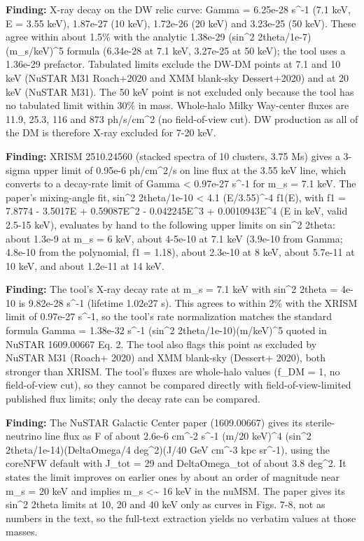 \documentclass[11pt,a4paper]{article}
\begin{document}
\textbf{Finding:} X-ray decay on the DW relic curve: Gamma = 6.25e-28 s\textasciicircum{}-1 (7.1 keV, E = 3.55 keV), 1.87e-27 (10 keV), 1.72e-26 (20 keV) and 3.23e-25 (50 keV). These agree within about 1.5\% with the analytic 1.38e-29 (sin\textasciicircum{}2 2theta/1e-7)(m\_s/keV)\textasciicircum{}5 formula (6.34e-28 at 7.1 keV, 3.27e-25 at 50 keV); the tool uses a 1.36e-29 prefactor. Tabulated limits exclude the DW-DM points at 7.1 and 10 keV (NuSTAR M31 Roach+2020 and XMM blank-sky Dessert+2020) and at 20 keV (NuSTAR M31). The 50 keV point is not excluded only because the tool has no tabulated limit within 30\% in mass. Whole-halo Milky Way-center fluxes are 11.9, 25.3, 116 and 873 ph/s/cm\textasciicircum{}2 (no field-of-view cut). DW production as all of the DM is therefore X-ray excluded for 7-20 keV.

\textbf{Finding:} XRISM 2510.24560 (stacked spectra of 10 clusters, 3.75 Ms) gives a 3-sigma upper limit of 0.95e-6 ph/cm\textasciicircum{}2/s on line flux at the 3.55 keV line, which converts to a decay-rate limit of Gamma \textless{} 0.97e-27 s\textasciicircum{}-1 for m\_s = 7.1 keV. The paper's mixing-angle fit, sin\textasciicircum{}2 2theta/1e-10 \textless{} 4.1 (E/3.55)\textasciicircum{}-4 f1(E), with f1 = 7.8774 - 3.5017E + 0.59087E\textasciicircum{}2 - 0.042245E\textasciicircum{}3 + 0.0010943E\textasciicircum{}4 (E in keV, valid 2.5-15 keV), evaluates by hand to the following upper limits on sin\textasciicircum{}2 2theta: about 1.3e-9 at m\_s = 6 keV, about 4-5e-10 at 7.1 keV (3.9e-10 from Gamma; 4.8e-10 from the polynomial, f1 = 1.18), about 2.3e-10 at 8 keV, about 5.7e-11 at 10 keV, and about 1.2e-11 at 14 keV.

\textbf{Finding:} The tool's X-ray decay rate at m\_s = 7.1 keV with sin\textasciicircum{}2 2theta = 4e-10 is 9.82e-28 s\textasciicircum{}-1 (lifetime 1.02e27 s). This agrees to within 2\% with the XRISM limit of 0.97e-27 s\textasciicircum{}-1, so the tool's rate normalization matches the standard formula Gamma = 1.38e-32 s\textasciicircum{}-1 (sin\textasciicircum{}2 2theta/1e-10)(m/keV)\textasciicircum{}5 quoted in NuSTAR 1609.00667 Eq. 2. The tool also flags this point as excluded by NuSTAR M31 (Roach+ 2020) and XMM blank-sky (Dessert+ 2020), both stronger than XRISM. The tool's fluxes are whole-halo values (f\_DM = 1, no field-of-view cut), so they cannot be compared directly with field-of-view-limited published flux limits; only the decay rate can be compared.

\textbf{Finding:} The NuSTAR Galactic Center paper (1609.00667) gives its sterile-neutrino line flux as F of about 2.6e-6 cm\textasciicircum{}-2 s\textasciicircum{}-1 (m/20 keV)\textasciicircum{}4 (sin\textasciicircum{}2 2theta/1e-14)(DeltaOmega/4 deg\textasciicircum{}2)(J/40 GeV cm\textasciicircum{}-3 kpc sr\textasciicircum{}-1), using the coreNFW default with J\_tot = 29 and DeltaOmega\_tot of about 3.8 deg\textasciicircum{}2. It states the limit improves on earlier ones by about an order of magnitude near m\_s = 20 keV and implies m\_s \textless{}\textasciitilde{} 16 keV in the nuMSM. The paper gives its sin\textasciicircum{}2 2theta limits at 10, 20 and 40 keV only as curves in Figs. 7-8, not as numbers in the text, so the full-text extraction yields no verbatim values at those masses.
\end{document}

